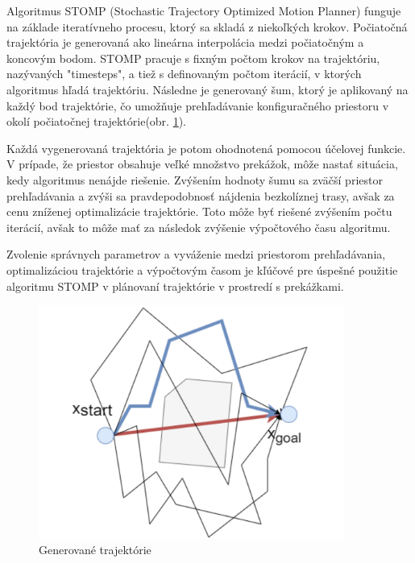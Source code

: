 Algoritmus STOMP (Stochastic Trajectory Optimized Motion Planner) funguje na základe iteratívneho procesu, ktorý sa skladá z niekoľkých krokov. Počiatočná trajektória je generovaná ako lineárna interpolácia medzi počiatočným a koncovým bodom. STOMP pracuje s fixným počtom krokov na trajektóriu, nazývaných "timesteps", a tiež s definovaným počtom iterácií, v ktorých algoritmus hľadá trajektóriu. Následne je generovaný šum, ktorý je aplikovaný na každý bod trajektórie, čo umožňuje prehľadávanie konfiguračného priestoru v okolí počiatočnej trajektórie(obr. \ref{OBRAZOK 1.2.5}).

Každá vygenerovaná trajektória je potom ohodnotená pomocou účelovej funkcie. V prípade, že priestor obsahuje veľké množstvo prekážok, môže nastať situácia, kedy algoritmus nenájde riešenie. Zvýšením hodnoty šumu sa zväčší priestor prehľadávania a zvýši sa pravdepodobnosť nájdenia bezkolíznej trasy, avšak za cenu zníženej optimalizácie trajektórie. Toto môže byť riešené zvýšením počtu iterácií, avšak to môže mať za následok zvýšenie výpočtového času algoritmu.

Zvolenie správnych parametrov a vyváženie medzi priestorom prehľadávania, optimalizáciou trajektórie a výpočtovým časom je kľúčové pre úspešné použitie algoritmu STOMP v plánovaní trajektórie v prostredí s prekážkami.

\begin{figure}[h]
	\centering
	\includegraphics[width=100mm]{img/STOMP.png}
	\caption{Generované trajektórie \cite{STOMP}}\label{OBRAZOK 1.2.5} 
\end{figure} 

\begin{figure}[h]
\end{figure} 


